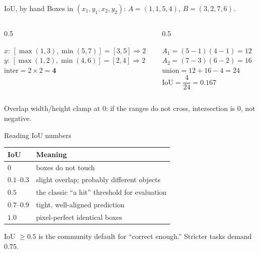 \documentclass[10pt,aspectratio=169]{beamer}
\begin{document}
\begin{frame}{IoU, by hand}
  Boxes in $(x_1,y_1,x_2,y_2)$: $A=(1,1,5,4)$, $B=(3,2,7,6)$.
  \begin{columns}[T]
    \begin{column}{0.5\textwidth}
      \begin{mathbox}
        $x$: $[\max(1,3),\min(5,7)]=[3,5]\Rightarrow 2$\\
        $y$: $[\max(1,2),\min(4,6)]=[2,4]\Rightarrow 2$\\
        $\text{inter}=2\times2=\mathbf{4}$
      \end{mathbox}
    \end{column}
    \begin{column}{0.5\textwidth}
      \begin{mathbox}
        $A_1=(5{-}1)(4{-}1)=12$\\
        $A_2=(7{-}3)(6{-}2)=16$\\
        $\text{union}=12+16-4=24$\\
        $\text{IoU}=\dfrac{4}{24}=\mathbf{0.167}$
      \end{mathbox}
    \end{column}
  \end{columns}
  \vspace{2pt}
  Overlap width/height clamp at $0$: if the ranges do not cross, intersection is $0$, not negative.
\end{frame}

\begin{frame}{Reading IoU numbers}
  \begin{center}
  \begin{tabular}{@{}ll@{}}
    \toprule
    \textbf{IoU} & \textbf{Meaning} \\
    \midrule
    $0$        & boxes do not touch \\
    $0.1$--$0.3$ & slight overlap; probably different objects \\
    $0.5$      & the classic ``a hit'' threshold for evaluation \\
    $0.7$--$0.9$ & tight, well-aligned prediction \\
    $1.0$      & pixel-perfect identical boxes \\
    \bottomrule
  \end{tabular}
  \end{center}
  \begin{goodbox}
    IoU $\ge 0.5$ is the community default for ``correct enough.'' Stricter tasks demand $0.75$.
  \end{goodbox}
\end{frame}
\end{document}
